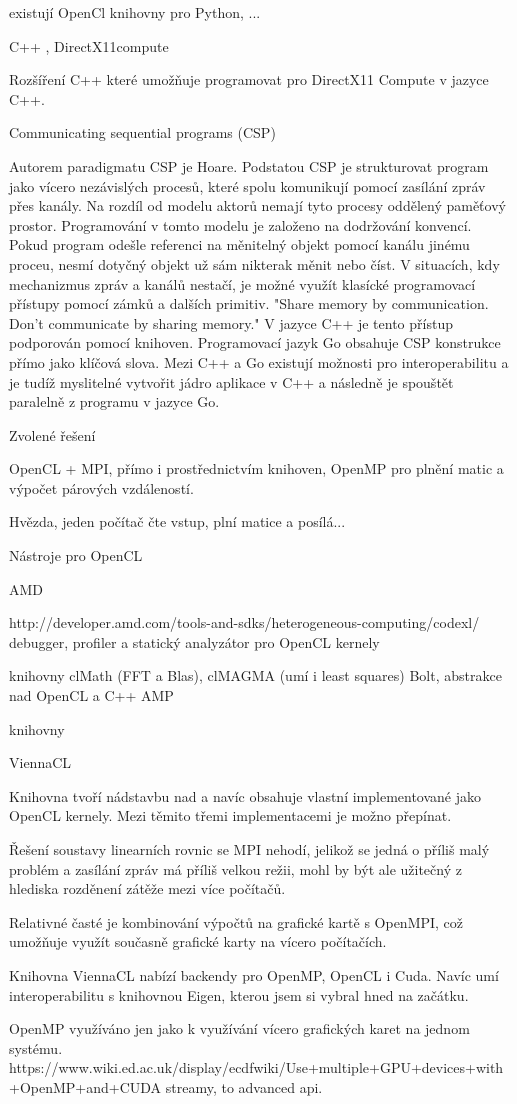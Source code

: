 existují OpenCl knihovny pro Python, ...

C++ , DirectX11compute

Rozšíření C++ které umožňuje programovat pro DirectX11 Compute v jazyce C++.

Communicating sequential programs (CSP)

Autorem paradigmatu CSP je Hoare. Podstatou CSP je strukturovat program jako vícero nezávislých procesů, které spolu komunikují pomocí zasílání zpráv přes kanály. Na rozdíl od modelu aktorů nemají tyto procesy oddělený paměťový prostor. Programování v tomto modelu je založeno na dodržování konvencí. Pokud program odešle referenci na měnitelný objekt pomocí kanálu jinému proceu, nesmí dotyčný objekt už sám nikterak měnit nebo číst. V situacích, kdy mechanizmus zpráv a kanálů nestačí, je možné využít klasícké programovací přístupy pomocí zámků a dalších primitiv. "Share memory by communication. Don't communicate by sharing memory." V jazyce C++ je tento přístup podporován pomocí knihoven. Programovací jazyk Go obsahuje CSP konstrukce přímo jako klíčová slova. Mezi C++ a Go existují možnosti pro interoperabilitu a je tudíž myslitelné vytvořit jádro aplikace v C++ a následně je spouštět paralelně z programu v jazyce Go.

Zvolené řešení

OpenCL + MPI, přímo i prostřednictvím knihoven, OpenMP pro plnění matic a výpočet párových vzdáleností.

Hvězda, jeden počítač čte vstup, plní matice a posílá...


Nástroje pro OpenCL

AMD

http://developer.amd.com/tools-and-sdks/heterogeneous-computing/codexl/
debugger, profiler a statický analyzátor pro OpenCL kernely

knihovny clMath (FFT a Blas), clMAGMA (umí i least squares)
Bolt, abstrakce nad OpenCL a C++ AMP

knihovny

ViennaCL

Knihovna tvoří nádstavbu nad  a navíc obsahuje vlastní implementované jako OpenCL kernely. Mezi těmito třemi implementacemi je možno přepínat.

Řešení soustavy linearních rovnic se MPI nehodí, jelikož se jedná o příliš malý problém a zasílání zpráv má příliš velkou režii, mohl by být ale užitečný z hlediska rozděnení zátěže mezi více počítačů.

Relativné časté je kombinování výpočtů na grafické kartě s OpenMPI, což umožňuje využít současně grafické karty na vícero počítačích.

Knihovna ViennaCL nabízí backendy pro OpenMP, OpenCL i Cuda. Navíc umí interoperabilitu s knihovnou Eigen, kterou jsem si vybral hned na začátku.

OpenMP využíváno jen jako k využívání vícero grafických karet na jednom systému. https://www.wiki.ed.ac.uk/display/ecdfwiki/Use+multiple+GPU+devices+with+OpenMP+and+CUDA streamy, to advanced api.